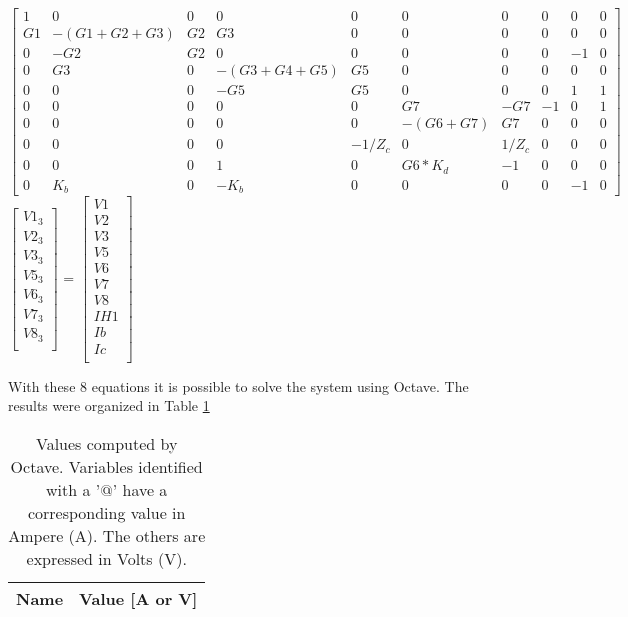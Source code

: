 {$ \begin{bmatrix}
1 & 0 & 0 & 0 & 0 & 0 & 0 & 0 & 0 & 0 \\
G1 & -(G1+G2+G3) & G2 & G3 & 0 & 0 & 0 & 0 & 0 & 0 \\
0 & -G2 & G2 & 0 & 0 & 0 & 0 & 0 & -1 & 0 \\
0 & G3 & 0 & -(G3+G4+G5) & G5 & 0 & 0 & 0 & 0 & 0 \\
0 & 0 & 0 & -G5 & G5 & 0 & 0 & 0 & 1 & 1 \\
0 & 0 & 0 & 0 & 0 & G7 & -G7 & -1 & 0 & 1 \\
0 & 0 & 0 & 0 & 0 & -(G6+G7) & G7 & 0 & 0 & 0 \\
0 & 0 & 0 & 0 & -1/Z_c & 0 & 1/Z_c & 0 & 0 & 0 \\
0 & 0 & 0 & 1 & 0 & G6*K_d & -1 & 0 & 0 & 0 \\
0 & K_b & 0 & -K_b & 0 & 0 & 0 & 0 & -1 & 0 
\end{bmatrix}  $
$ \begin{bmatrix}
V1_3 \\
V2_3 \\
V3_3 \\
V5_3 \\
V6_3 \\
V7_3 \\
V8_3 \\
\end{bmatrix}  $
=
$ \begin{bmatrix}
V1 \\
V2 \\
V3 \\
V5 \\
V6 \\
V7 \\
V8 \\
IH1 \\
Ib \\
Ic \\
\end{bmatrix}  $
}

With these 8 equations it is possible to solve the system using Octave.
The results were organized in Table \ref{tab:node}

\begin{table}[ht]
	\centering
	\begin{tabular}{|l|r|}
    		\hline    
    		{\bf Name} & {\bf Value [A or V]} \\ \hline
    		
  	\end{tabular}
  	\caption{Values computed by Octave. Variables identified with a '$@$' have a
  	corresponding value in Ampere (A). The others are expressed in Volts (V).}
 
\label{tab:node}
\end{table}

